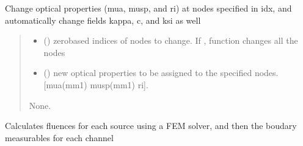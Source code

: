 \documentclass[letterpaper,10pt,english]{sphinxmanual}
\begin{document}
\begin{fulllineitems}
\begin{fulllineitems}
\label{\detokenize{_autosummary/nirfasterff.base.stnd_mesh.stndmesh:nirfasterff.base.stnd_mesh.stndmesh.change_prop}}
\pysigstartsignatures
{}
\pysigstopsignatures
\sphinxAtStartPar
Change optical properties (mua, musp, and ri) at nodes specified in idx, and automatically change fields kappa, c, and ksi as well
\begin{quote}\begin{description}
\begin{itemize}
\item {} 
\sphinxAtStartPar
{} () \textendash{} zero\sphinxhyphen{}based indices of nodes to change. If , function changes all the nodes

\item {} 
\sphinxAtStartPar
{} () \textendash{} new optical properties to be assigned to the specified nodes. {[}mua(mm\sphinxhyphen{}1) musp(mm\sphinxhyphen{}1) ri{]}.

\end{itemize}

\sphinxAtStartPar
None.

\end{description}\end{quote}

\end{fulllineitems}


\begin{fulllineitems}
\label{\detokenize{_autosummary/nirfasterff.base.stnd_mesh.stndmesh:nirfasterff.base.stnd_mesh.stndmesh.femdata}}
\pysigstartsignatures
{}
\pysigstopsignatures
\sphinxAtStartPar
Calculates fluences for each source using a FEM solver, and then the boudary measurables for each channel


\end{fulllineitems}
\end{fulllineitems}
\end{document}
